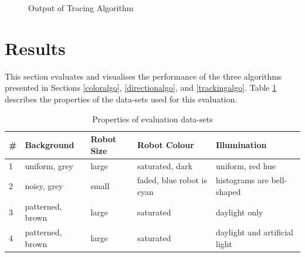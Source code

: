 \documentclass[10pt,a4paper]{article}
\begin{document}
\begin{figure}[ht]
    \begin{center}
    \end{center}
    \caption{Output of Tracing Algorithm}
    \label{trackingfig}
\end{figure}


\section{Results}\label{results}
This section evaluates and visualises the performance of the three algorithms 
presented in Sections \ref{coloralgo}, \ref{directionalgo}, and 
\ref{trackingalgo}. Table \ref{datasetpropstable} describes the properties of 
the data-sets used for this evaluation.
\begin{table}[ht]
\begin{tabular}{|l || l | l | p{2cm} | p{4cm}|}
\hline
\# & Background & Robot Size & Robot Colour & Illumination \\
\hline
1 & uniform, grey & large & saturated, dark & uniform, red hue \\
\hline
2 & noisy, grey & small & faded, blue robot is cyan & 
    histograms are bell-shaped \\
\hline
3 & patterned, brown & large & saturated & daylight only \\
\hline
4 & patterned, brown & large & saturated & daylight and artificial 
    light \\
\hline
\end{tabular}
\caption{Properties of evaluation data-sets}
\label{datasetpropstable}
\end{table}
\end{document}
